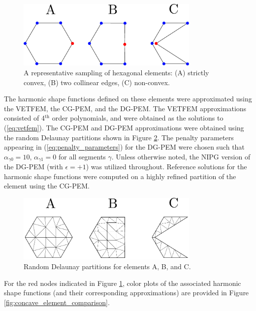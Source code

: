 \begin{figure}[!h]
  \centering
  \includegraphics[width=3.5in]{figures/concave_element_shapes.pdf}  \caption{A representative sampling of hexagonal elements: (A) strictly convex, (B) two collinear edges, (C) non-convex.}
  \label{fig:concave_element_shapes}
\end{figure}

The harmonic shape functions defined on these elements were approximated using the VETFEM, the CG-PEM, and the DG-PEM. The VETFEM approximations consisted of 4$^{\text{th}}$ order polynomials, and were obtained as the solutions to (\ref{eq:vetfem}). The CG-PEM and DG-PEM approximations were obtained using the random Delaunay partitions shown in Figure \ref{fig:concave_element_partitions}. The penalty parameters appearing in (\ref{eq:penalty_parameters}) for the DG-PEM were chosen such that $\alpha_{\gamma0} = 10$, $\alpha_{\gamma1} = 0$ for all segments $\gamma$. Unless otherwise noted, the NIPG version of the DG-PEM (with $\epsilon = +1$) was utilized throughout. Reference solutions for the harmonic shape functions were computed on a highly refined partition of the element using the CG-PEM.

\begin{figure}[!h]
  \centering
  \includegraphics[width=3.5in]{figures/concave_element_partitions.pdf}  \caption{Random Delaunay partitions for elements A, B, and C.}
  \label{fig:concave_element_partitions}
\end{figure}

For the red nodes indicated in Figure \ref{fig:concave_element_shapes}, color plots of the associated harmonic shape functions (and their corresponding approximations) are provided in Figure \ref{fig:concave_element_comparison}.

